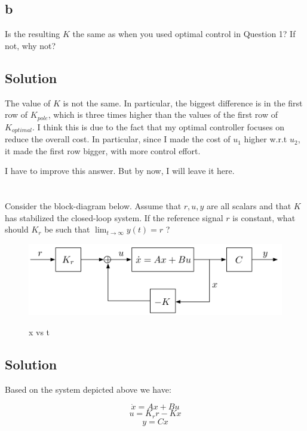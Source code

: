 \documentclass[10pt,a4paper]{article}
\begin{document}
\subsection*{b}
Is the resulting $K$ the same as when you used optimal control in Question 1? If not, why not?
\subsection*{Solution}
The value of $K$ is not the same. In particular, the biggest difference is in the first row of $K_{pole}$, which is three times higher than the values of the first row of $K_{optimal}$. I think this is due to the fact that my optimal controller focuses on reduce the overall cost. In particular, since I made the cost of $u_{1}$ higher w.r.t $u_{2}$, it made the first row bigger, with more control effort.

I have to improve this answer. But by now, I will leave it here.

\section{}
Consider the block-diagram below. Assume that $r,u,y$ are all scalars and that $K$ has stabilized the closed-loop system. If the reference signal $r$ is constant, what should $K_{r}$ be such that $ \lim_{t \rightarrow \infty } y(t) = r$ ?

	\begin{figure}[H]
	\begin{center}
       \includegraphics[scale=0.25]{figures/Question3.png} 
	   \label{fig:Question3}
	\caption{ x vs t}
	\end{center}
	\end{figure}
    
\subsection*{Solution}
Based on the system depicted above we have:

\[ \dot{x} = Ax + Bu \]
\[ u = K_{r}r - Kx \]
\[ y = Cx \]
\end{document}
